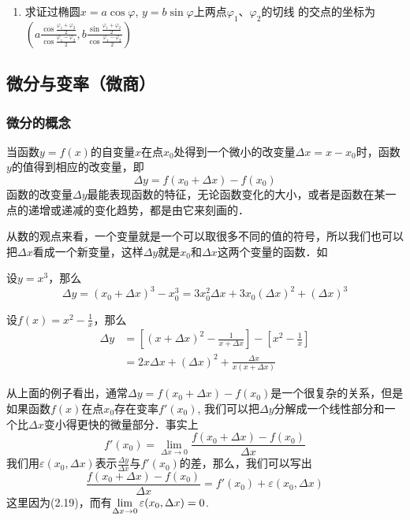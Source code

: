 \begin{ex}
\begin{enumerate}
\item 求证过椭圆$x=a\cos\varphi$, $y=b\sin\varphi$上两点$\varphi_1$、$\varphi_2$的切线
的交点的坐标为
$\left(a\frac{\cos\frac{\varphi_1+\varphi_2}{2}}{\cos\frac{\varphi_1-\varphi_2}{2}}, b\frac{\sin\frac{\varphi_1+\varphi_2}{2}}{\cos\frac{\varphi_1-\varphi_2}{2}}\right)$
\end{enumerate}
\end{ex}

\subsection{微分与变率（微商）}

\subsubsection{微分的概念}

当函数$y=f(x)$的自变量$x$在点$x_0$处得到一个微小的改变量$\Delta x=x-x_0$时，函数$y$的值得到相应的改变量，即
\begin{equation}
    \Delta y=f (x_0+\Delta x) -f (x_0) 
\end{equation} 
函数的改变量$\Delta y$最能表现函数的特征，无论函数变化的大小，或者是函数在某一点的递增或递减的变化趋势，都是由它来刻画的．

从数的观点来看，一个变量就是一个可以取很多不同的值的符号，所以我们也可以把$\Delta x$看成一个新变量，这样$\Delta y$就是$x_0$和$\Delta x$这两个变量的函数．如

\begin{example}
    设$y=x^3$，那么
\[\Delta y=(x_0+\Delta x)^3-x^3_0 =3x_0^2\Delta x+3x_0(\Delta x)^2+(\Delta x)^3\]
\end{example}

\begin{example}
    设$f(x)=x^2-\frac{1}{x}$，那么
\begin{align*}
    \Delta y&=\left[(x+\Delta x)^2-\frac{1}{x+\Delta x}\right]-\left[x^2-\frac{1}{x}\right]\\
    &=2x\Delta x+(\Delta x)^2+\frac{\Delta x}{x(x+\Delta x)}
\end{align*} 
\end{example}

从上面的例子看出，通常$\Delta y=f(x_0+\Delta x)-f(x_0)$是一个很复杂的关系，但是如果函数$f(x)$在点$x_0$存在变率$f'(x_0)$, 我们可以把$\Delta y$分解成一个线性部分和一个比$\Delta x$变小得更快的微量部分．事实上
\begin{equation}
 f'(x_0)=\lim_{\Delta x\to 0}\frac{f(x_0+\Delta x)-f(x_0)}{\Delta x}
\end{equation}
我们用$\varepsilon(x_0,\Delta x)$表示$\frac{\Delta 
y}{\Delta x}$与$f'(x_0)$的差，那么，我们可以写出
\begin{equation}
\frac{f(x_0+\Delta x)-f(x_0)}{\Delta x}=f'(x_0)+\varepsilon(x_0,\Delta x)
\end{equation}
这里因为(2.19)，而有$\displaystyle\lim_{\Delta x\to 0}\varepsilon(x_0,\Delta x)=0$.

